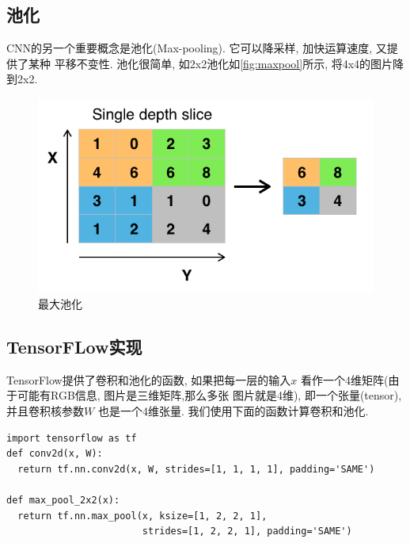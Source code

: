 \documentclass{ctexart}
\begin{document}
\subsection{池化}
CNN的另一个重要概念是池化(Max-pooling).
它可以降采样, 加快运算速度, 又提供了某种
平移不变性. 池化很简单, 如2x2池化如\autoref{fig:maxpool}所示,
将4x4的图片降到2x2.
\begin{figure}[htb]
  \centering
  \includegraphics[width=.8\textwidth]{Max_pooling}
  \caption{最大池化}
  \label{fig:maxpool}
\end{figure}

\subsection{TensorFLow实现}
TensorFlow提供了卷积和池化的函数, 如果把每一层的输入\(x\)
看作一个4维矩阵(由于可能有RGB信息, 图片是三维矩阵,那么多张
图片就是4维), 即一个张量(tensor), 并且卷积核参数\(W\)
也是一个4维张量. 我们使用下面的函数计算卷积和池化.
\begin{lstlisting}
import tensorflow as tf
def conv2d(x, W):
  return tf.nn.conv2d(x, W, strides=[1, 1, 1, 1], padding='SAME')

def max_pool_2x2(x):
  return tf.nn.max_pool(x, ksize=[1, 2, 2, 1],
                        strides=[1, 2, 2, 1], padding='SAME')
\end{lstlisting}
\end{document}
